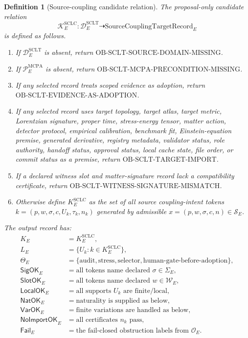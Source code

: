 \documentclass[11pt]{article}
\newcommand{\SourceCoupRec}{\mathrm{SourceCouplingTargetRecord}}
\newtheorem{definition}{Definition}
\begin{document}
\begin{definition}[Source-coupling candidate relation]
The proposal-only candidate relation
\[
  \mathcal{K}^{\mathrm{SCLC}}_E:
  \mathcal{D}^{\mathrm{SCLT}}_E \dashrightarrow \SourceCoupRec_E
\]
is defined as follows.

\begin{enumerate}[label=\textup{(\alph*)}]
  \item If \(\mathcal{D}^{\mathrm{SCLT}}_E\) is absent, return
  \(\mathrm{OB\text{-}SCLT\text{-}SOURCE\text{-}DOMAIN\text{-}MISSING}\).
  \item If \(\mathcal{P}^{\mathrm{MCPA}}_E\) is absent, return
  \(\mathrm{OB\text{-}SCLT\text{-}MCPA\text{-}PRECONDITION\text{-}MISSING}\).
  \item If any selected record treats scoped evidence as adoption, return
  \(\mathrm{OB\text{-}SCLT\text{-}EVIDENCE\text{-}AS\text{-}ADOPTION}\).
  \item If any selected record uses target topology, target atlas, target
  metric, Lorentzian signature, proper time, stress-energy tensor, matter
  action, detector protocol, empirical calibration, benchmark fit,
  Einstein-equation premise, generated derivative, registry metadata,
  validator status, role authority, handoff status, approval status, local
  cache state, file order, or commit status as a premise, return
  \(\mathrm{OB\text{-}SCLT\text{-}TARGET\text{-}IMPORT}\).
  \item If a declared witness slot and matter-signature record lack a
  compatibility certificate, return
  \(\mathrm{OB\text{-}SCLT\text{-}WITNESS\text{-}SIGNATURE\text{-}MISMATCH}\).
  \item Otherwise define \(K^{\mathrm{SCLC}}_E\) as the set of all
  source coupling-intent tokens \(k=(p,w,\sigma,c,U_k,\tau_k,n_k)\)
  generated by admissible \(x=(p,w,\sigma,c,n)\in\mathcal{S}_E\).
\end{enumerate}

The output record has:
\[
\begin{aligned}
K_E &= K^{\mathrm{SCLC}}_E,\\
L_E &= \{U_k : k\in K^{\mathrm{SCLC}}_E\},\\
\Theta_E &= \{\text{audit},\text{stress},\text{selector},\text{human-gate-before-adoption}\},\\
\mathsf{SigOK}_E &= \text{all tokens name declared }\sigma\in\Sigma_E,\\
\mathsf{SlotOK}_E &= \text{all tokens name declared }w\in\mathcal{W}_E,\\
\mathsf{LocalOK}_E &= \text{all supports }U_k\text{ are finite/local},\\
\mathsf{NatOK}_E &= \text{naturality is supplied as below},\\
\mathsf{VarOK}_E &= \text{finite variations are handled as below},\\
\mathsf{NoImportOK}_E &= \text{all certificates }n_k\text{ pass},\\
\mathsf{Fail}_E &= \text{the fail-closed obstruction labels from }\mathcal{O}_E.
\end{aligned}
\]
\end{definition}
\end{document}
